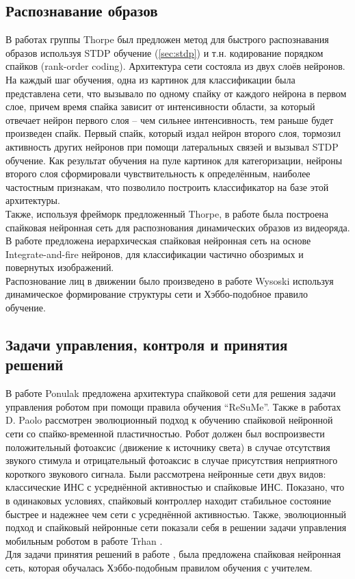 \documentclass[a4paper,10pt]{article}
\begin{document}
\subsection{Распознавание образов}
\indent В работах группы Thorpe \cite{thorpe2001spike,guyonneau2004temporal,perrinet2004sparse} был предложен метод для быстрого распознавания образов используя STDP обучение (\ref{sec:stdp}) и т.н. кодирование порядком спайков (rank-order coding). Архитектура сети состояла из двух слоёв нейронов. На каждый шаг обучения, одна из картинок для классификации была представлена сети, что вызывало по одному спайку от каждого нейрона в первом слое, причем время спайка зависит от интенсивности области, за который отвечает нейрон первого слоя -- чем сильнее интенсивность, тем раньше будет произведен спайк. Первый спайк, который издал нейрон второго слоя, тормозил активность других нейронов при помощи латеральных связей и вызывал STDP обучение. Как результат обучения на пуле картинок для категоризации, нейроны второго слоя сформировали чувствительность к определённым, наиболее частостным признакам, что позволило построить классификатор на базе этой архитектуры.\\
\indent Также, используя фрейморк предложенный Thorpe, в работе \cite{kornprobst2005could} была построена спайковая нейронная сеть для распознования динамических образов из видеоряда. В работе \cite{shin2010recognition} предложена иерархическая спайковая нейронная сеть на основе Integrate-and-fire нейронов, для классификации частично обозримых и повернутых изображений.\\
\indent Распознование лиц в движении было произведено в работе Wysoski \cite{wysoski2008fast} используя динамическое формирование структуры сети и Хэббо-подобное правило обучение.
\subsection{Задачи управления, контроля и принятия решений}
\indent В работе Ponulak \cite{ponulak2006resume} предложена архитектура спайковой сети для решения задачи управления роботом при помощи правила обучения ``ReSuMe''. Также в работах D. Paolo \cite{paolo2003a, paolo2003b} рассмотрен эволюционный подход к обучению спайковой нейронной сети со спайко-временной пластичностью. Робот должен был воспроизвести положительный фотоаксис (движение к источнику света) в случае отсутствия звукого стимула и отрицательный фотоаксис в случае присутствия неприятного короткого звукового сигнала. Были рассмотрена нейронные сети двух видов: классические ИНС с усреднённой активностью и спайковые ИНС. Показано, что в одинаковых условиях, спайковый контроллер находит стабильное состояние быстрее и надежнее чем сети с усреднённой активностью. Также, эволюционный подход и спайковый нейронные сети показали себя в решении задачи управления мобильным роботом в работе Trhan \cite{trhan2012application}.\\
\indent Для задачи принятия решений в работе \cite{glackin2008implementing}, была предложена спайковая нейронная сеть, которая обучалась Хэббо-подобным правилом обучения с учителем. 
\end{document}
